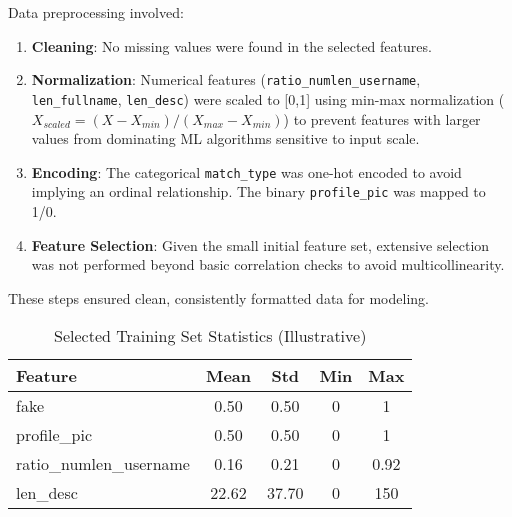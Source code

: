 \documentclass[conference]{IEEEtran}
\begin{document}
Data preprocessing involved:
\begin{enumerate}
    \item \textbf{Cleaning}: No missing values were found in the selected features.
    \item \textbf{Normalization}: Numerical features (\texttt{ratio\_numlen\_username}, \texttt{len\_fullname}, \texttt{len\_desc}) were scaled to [0,1] using min-max normalization ($X_{scaled} = (X - X_{min}) / (X_{max} - X_{min})$) to prevent features with larger values from dominating ML algorithms sensitive to input scale.
    \item \textbf{Encoding}: The categorical \texttt{match\_type} was one-hot encoded to avoid implying an ordinal relationship. The binary \texttt{profile\_pic} was mapped to 1/0.
    \item \textbf{Feature Selection}: Given the small initial feature set, extensive selection was not performed beyond basic correlation checks to avoid multicollinearity.
\end{enumerate}
These steps ensured clean, consistently formatted data for modeling.

\begin{table}[htbp]
\caption{Selected Training Set Statistics (Illustrative)}
\begin{center}
\begin{tabular}{|l|c|c|c|c|}
\hline
\textbf{Feature} & \textbf{Mean} & \textbf{Std} & \textbf{Min} & \textbf{Max} \\
\hline
fake & 0.50 & 0.50 & 0 & 1 \\
profile\_pic & 0.50 & 0.50 & 0 & 1 \\
ratio\_numlen\_username & 0.16 & 0.21 & 0 & 0.92 \\
len\_desc & 22.62 & 37.70 & 0 & 150 \\
\hline
\end{tabular}
\label{tab:stats}
\end{center}
\end{table}
\end{document}
